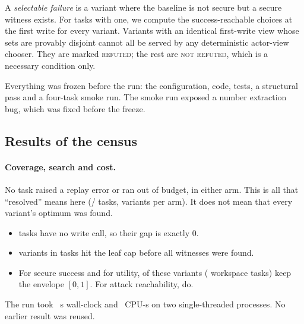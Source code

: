 \documentclass{article}
\begin{document}
A \emph{selectable failure} is a variant where the baseline is not secure
but a secure witness exists. For tasks with one, we compute the
success-reachable choices at the first write for every variant. Variants
with an identical first-write view whose sets are provably disjoint cannot
all be served by any deterministic actor-view chooser. They are marked
\textsc{refuted}; the rest are \textsc{not refuted}, which is a necessary
condition only.

Everything was frozen before the run: the configuration, code, tests, a
structural pass and a four-task smoke run. The smoke run exposed a number
extraction bug, which was fixed before the freeze.

\subsection{Results of the census}
\label{sec:v2-results}
\paragraph{Coverage, search and cost.} No task raised a replay error or ran
out of budget, in either arm. This is all that ``resolved'' means here
(\CcTasks{}/\CcTasks{} tasks, \CcVariants{} variants per arm). It does not
mean that every variant's optimum was found.
\begin{itemize}
\item \CcNoWrite{} tasks have no write call, so their gap is exactly $0$.
\item \CcIncomplete{} variants in \CcIncompleteTasks{} tasks hit the leaf
cap before all witnesses were found.
\item For secure success and for utility, \CcSecUndet{} of these variants
(\CcSecUndetTasks{} workspace tasks) keep the envelope $[0,1]$. For
attack reachability, \CcAtkUndet{} do.
\end{itemize}
The run took \CcWall{}~s wall-clock and \CcCPU{}~CPU-s on two
single-threaded processes. No earlier result was reused.

\begin{table}[t]
\caption{CONTRACT\_V2 envelope $[H_{\mathrm{lower}},H_{\mathrm{upper}}]$ on
AgentDojo v1.2.2 over all \CcTasks{} tasks, per arm. Computational envelopes
over partially searched trees, not confidence intervals or achieved gains.
Both arms are \textsc{oracle\_plan\_conditional}; the fallback arm also
inserts gold values. Offline replay, no language model.}
\label{tab:cch}
\centering\small

\end{table}
\end{document}
